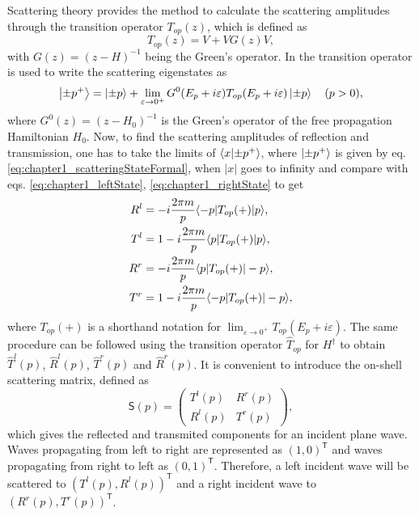 Scattering theory provides the method to calculate the scattering amplitudes through the transition operator $T_{op}(z)$, which is defined as
%
\begin{equation}
T_{op}(z) = V + VG(z)V,
\label{eq:chapter1_transitionOperator_definition}
\end{equation}
%
with $G(z) = (z-H)^{-1}$ being the Green's operator. In \cite{Muga2004} the transition operator is used to write the scattering eigenstates as
%
\begin{equation}
  \ket{\pm p^+} =  \ket{\pm p} + \lim_{ \varepsilon\to 0^+ } G^0(E_p + i\varepsilon)T_{op}(E_p + i\varepsilon)\ket{\pm p}\quad (p>0),
  \label{eq:chapter1_scatteringStateFormal}
\end{equation}
%
where $G^0(z) = (z-H_0)^{-1}$ is the Green's operator of the free propagation Hamiltonian $H_0$. Now, to find the scattering amplitudes of reflection and transmission, one has to take the limits of $\braket{x}{\pm p^+}$, where $\ket{\pm p^+}$ is given by eq. \eqref{eq:chapter1_scatteringStateFormal}, when $|x|$ goes to infinity and compare with eqs. \eqref{eq:chapter1_leftState}, \eqref{eq:chapter1_rightState} to get
%
\begin{align}
R^l&=-i\frac{2\pi m}{p}\la -p|T_{op}(+)|p\ra\nonumber,
\\
T^l&=1-i\frac{2\pi m}{p} \la p|T_{op}(+)|p\ra\nonumber,
\\
R^r&=-i\frac{2\pi m}{p}\la p|T_{op}(+)|-p\ra\nonumber,
\\
T^r&=1-i\frac{2\pi m}{p}\la -p|T_{op}(+)|-p\ra,
\label{eq:chapter1_amplitudesFromTOperator}
\end{align}
%
where $T_{op}(+)$ is a shorthand notation for $\lim_{ \varepsilon\to 0^+ } T_{op}(E_p + i\varepsilon)$. The same procedure can be followed using the transition operator $\widehat{T}_{op}$ for $H^\dagger$ to obtain $\widehat{T}^l(p)$, $\widehat{R}^l(p)$, $\widehat{T}^r(p)$ and $\widehat{R}^r(p)$. It is convenient to introduce the on-shell scattering matrix, defined as
%
\begin{equation}
  \mathsf{S}(p) =
  \left(
  \begin{array}{cc}
    T^l(p)&R^r(p)
    \\
    R^l(p)&T^r(p)
  \end{array}
  \right),
  \label{eq:chapter1_onShellMatrix}
\end{equation}
%
which gives the reflected and transmited components for an incident plane wave. Waves propagating from left to right are represented as $\left(1,0\right)^\mathsf{T}$ and waves propagating from right to left as $\left(0,1\right)^\mathsf{T}$. Therefore, a left incident wave will be scattered to $\left(T^l(p),R^l(p)\right)^\mathsf{T}$ and a right incident wave to $\left(R^r(p),T^r(p)\right)^\mathsf{T}$.


